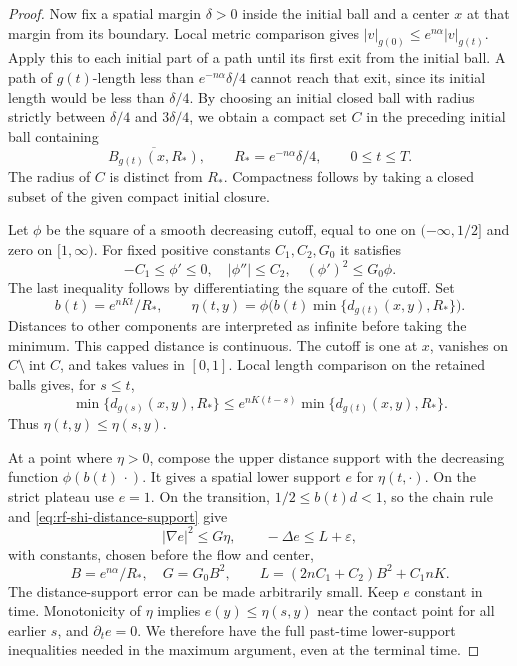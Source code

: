 \begin{proof}
Now fix a spatial margin $\delta>0$ inside the initial ball and a
center $x$ at that margin from its boundary.  Local metric comparison
gives $|v|_{g(0)}\leq e^{n\alpha}|v|_{g(t)}$.  Apply this to each
initial part of a path until its first exit from the initial ball.
A path of $g(t)$-length less than $e^{-n\alpha}\delta/4$ cannot reach
that exit, since its initial length would be less than $\delta/4$.
By choosing an initial closed ball with radius strictly between
$\delta/4$ and $3\delta/4$, we obtain a compact set $C$ in the preceding
initial ball containing
\[
 \overline{B_{g(t)}(x,R_*)},\qquad
 R_*=e^{-n\alpha}\delta/4,\qquad 0\leq t\leq T.
\]
The radius of $C$ is distinct from $R_*$.  Compactness follows by taking
a closed subset of the given compact initial closure.

Let $\phi$ be the square of a smooth decreasing cutoff, equal to one
on $(-\infty,1/2]$ and zero on $[1,\infty)$.  For fixed positive
constants $C_1,C_2,G_0$ it satisfies
\[
 -C_1\leq\phi'\leq0,\quad |\phi''|\leq C_2,\quad
 (\phi')^2\leq G_0\phi.
\]
The last inequality follows by differentiating the square of the cutoff.
Set
\[
 b(t)=e^{nKt}/R_*,\qquad
 \eta(t,y)=\phi\bigl(b(t)\min\{d_{g(t)}(x,y),R_*\}\bigr).
\]
Distances to other components are interpreted as infinite before taking
the minimum.  This capped distance is continuous.  The cutoff is one
at $x$, vanishes on $C\setminus\operatorname{int}C$, and takes values
in $[0,1]$.  Local length comparison on the retained balls gives, for
$s\leq t$,
\[
 \min\{d_{g(s)}(x,y),R_*\}
 \leq e^{nK(t-s)}\min\{d_{g(t)}(x,y),R_*\}.
\]
Thus $\eta(t,y)\leq\eta(s,y)$.

At a point where $\eta>0$, compose the upper distance support with
the decreasing function $\phi(b(t)\,\cdot)$.  It gives a spatial lower
support $e$ for $\eta(t,\cdot)$.  On the strict plateau use $e=1$.
On the transition, $1/2\leq b(t)d<1$, so the chain rule and
\eqref{eq:rf-shi-distance-support} give
\[
 |\nabla e|^2\leq G\eta,\qquad -\Delta e\leq L+\varepsilon,
\]
with constants, chosen before the flow and center,
\[
 B=e^{n\alpha}/R_*,\quad G=G_0B^2,\qquad
 L=(2nC_1+C_2)B^2+C_1nK.
\]
The distance-support error can be made arbitrarily small.  Keep $e$
constant in time.  Monotonicity of $\eta$ implies $e(y)\leq\eta(s,y)$
near the contact point for all earlier $s$, and $\partial_te=0$.
We therefore have the full past-time lower-support inequalities
needed in the maximum argument, even at the terminal time.


\end{proof}
